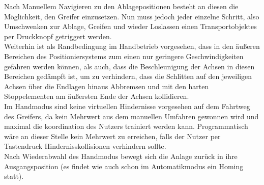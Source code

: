 \documentclass[../Bachelorarbeit.tex]{subfiles}
\begin{document}
Nach Manuellem Navigieren zu den Ablagepositionen besteht an diesen die Möglichkeit, den Greifer einzusetzen. Nun muss jedoch jeder einzelne Schritt, also Umschwenken zur Ablage, Greifen und wieder Loslassen einen Transportobjektes per Druckknopf getriggert werden.\\
Weiterhin ist als Randbedingung im Handbetrieb vorgesehen, dass in den äußeren Bereichen des Positioniersystems zum einen nur geringere Geschwindigkeiten gefahren werden können, als auch, dass die Beschleunigung der Achsen in diesen Bereichen gedämpft ist, um zu verhindern, dass die Schlitten auf den jeweiligen Achsen über die Endlagen hinaus Abbremsen und mit den harten Stoppelementen am äußersten Ende der Achsen kollidieren.\\
Im Handmodus sind keine virtuellen Hindernisse vorgesehen auf dem Fahrtweg des Greifers, da kein Mehrwert aus dem manuellen Umfahren gewonnen wird und maximal die koordination des Nutzers trainiert werden kann. Programmatisch wäre an dieser Stelle kein Mehrwert zu erreichen, falls der Nutzer per Tastendruck Hindernisskollisionen verhindern sollte.\\
Nach Wiederabwahl des Handmodus bewegt sich die Anlage zurück in ihre Ausgangsposition (es findet wie auch schon im Automatikmodus ein Homing statt).
\end{document}
